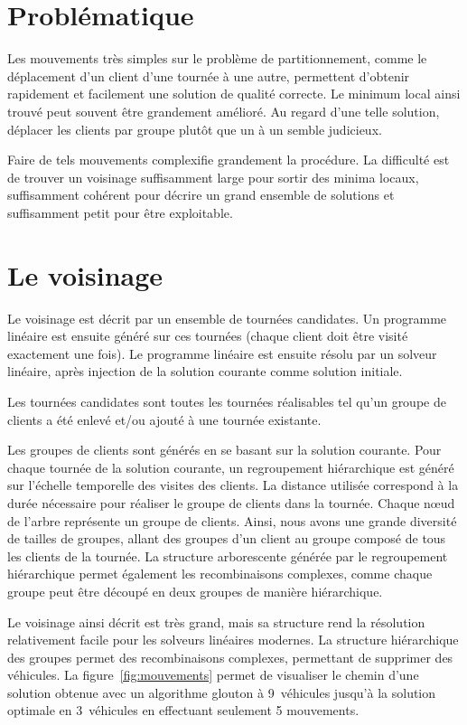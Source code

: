 \documentclass{roadef}
\begin{document}
\section{Problématique}

Les mouvements très simples sur le problème de partitionnement, comme
le déplacement d'un client d'une tournée à une autre, permettent
d'obtenir rapidement et facilement une solution de qualité
correcte. Le minimum local ainsi trouvé peut souvent être grandement
amélioré. Au regard d'une telle solution, déplacer les clients par
groupe plutôt que un à un semble judicieux.

Faire de tels mouvements complexifie grandement la procédure. La
difficulté est de trouver un voisinage suffisamment large pour sortir
des minima locaux, suffisamment cohérent pour décrire un grand ensemble
de solutions et suffisamment petit pour être exploitable.

\section{Le voisinage}

Le voisinage est décrit par un ensemble de tournées candidates. Un
programme linéaire est ensuite généré sur ces tournées (chaque client
doit être visité exactement une fois). Le programme linéaire est
ensuite résolu par un solveur linéaire, après injection de la solution
courante comme solution initiale.

Les tournées candidates sont toutes les tournées réalisables tel qu'un
groupe de clients a été enlevé et/ou ajouté à une tournée existante.

Les groupes de clients sont générés en se basant sur la solution
courante. Pour chaque tournée de la solution courante, un regroupement
hiérarchique est généré sur l'échelle temporelle des visites des
clients. La distance utilisée correspond à la durée nécessaire pour
réaliser le groupe de clients dans la tournée. Chaque nœud de l'arbre
représente un groupe de clients. Ainsi, nous avons une grande
diversité de tailles de groupes, allant des groupes d'un client au
groupe composé de tous les clients de la tournée. La structure
arborescente générée par le regroupement hiérarchique permet également
les recombinaisons complexes, comme chaque groupe peut être découpé en
deux groupes de manière hiérarchique.

Le voisinage ainsi décrit est très grand, mais sa structure rend la
résolution relativement facile pour les solveurs linéaires
modernes. La structure hiérarchique des groupes permet des
recombinaisons complexes, permettant de supprimer des véhicules. La
figure~\ref{fig:mouvements} permet de visualiser le chemin d'une
solution obtenue avec un algorithme glouton à 9~véhicules jusqu'à la
solution optimale en 3~véhicules en effectuant seulement 5 mouvements.
\end{document}
